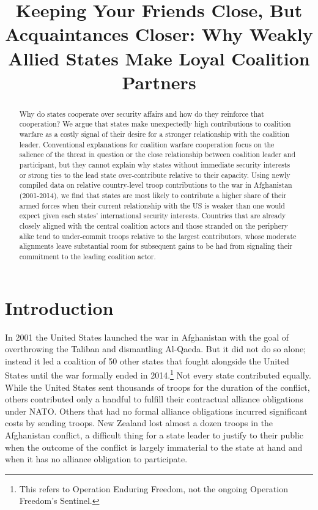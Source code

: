 \documentclass[12pt,letterpaper]{article}
\title{Keeping Your Friends Close, But Acquaintances Closer: Why Weakly Allied States Make Loyal Coalition Partners}
\begin{document}
	
\begin{singlespace}
\maketitle

\begin{abstract}
Why do states cooperate over security affairs and how do they reinforce that cooperation? We argue that states make unexpectedly high contributions to coalition warfare as a costly signal of their desire for a stronger relationship with the coalition leader. Conventional explanations for coalition warfare cooperation focus on the salience of the threat in question or the close relationship between coalition leader and participant, but they cannot explain why states without immediate security interests or strong ties to the lead state over-contribute relative to their capacity. Using newly compiled data on relative country-level troop contributions to the war in Afghanistan (2001-2014), we find that states are most likely to contribute a higher share of their armed forces when their current relationship with the US is weaker than one would expect given each states' international security interests. Countries that are already closely aligned with the central coalition actors and those stranded on the periphery alike tend to under-commit troops relative to the largest contributors, whose moderate alignments leave substantial room for subsequent gains to be had from signaling their commitment to the leading coalition actor.
\end{abstract}
\end{singlespace}

\section{Introduction}
	In 2001 the United States launched the war in Afghanistan with the goal of overthrowing the Taliban and dismantling Al-Qaeda. But it did not do so alone; instead it led a coalition of 50 other states that fought alongside the United States until the war formally ended in 2014.\footnote{This refers to Operation Enduring Freedom, not the ongoing Operation Freedom's Sentinel.} Not every state contributed equally. While the United States sent thousands of troops for the duration of the conflict, others contributed only a handful to fulfill their contractual alliance obligations under NATO. Others that had no formal alliance obligations incurred significant costs by sending troops. New Zealand lost almost a dozen troops in the Afghanistan conflict, a difficult thing for a state leader to justify to their public when the outcome of the conflict is largely immaterial to the state at hand and when it has no alliance obligation to participate.
\end{document}
